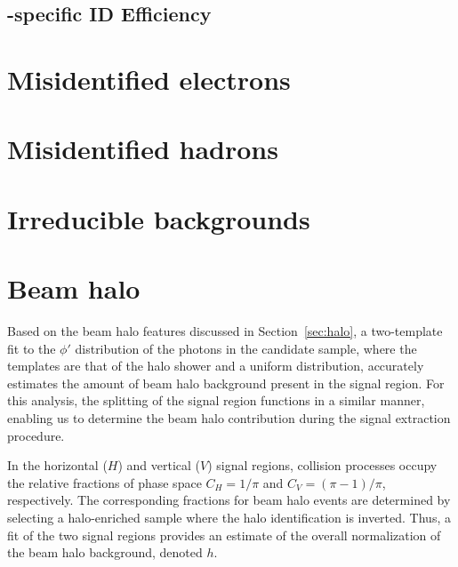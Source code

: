 

\subsection{\Pgg-specific ID Efficiency}
\label{sec:pvsf}



\section{Misidentified electrons}
\label{sec:efake}



\section{Misidentified hadrons}
\label{sec:hfake}



\section{Irreducible backgrounds}
\label{sec:irreducible}



\section{Beam halo}
\label{sec:halo_estimate}

Based on the beam halo features discussed in Section~\ref{sec:halo}, a two-template fit to the $\phi'$ distribution of the photons in the candidate sample, where the templates are that of the halo shower and a uniform distribution, accurately estimates the amount of beam halo background present in the signal region. 
For this analysis, the splitting of the signal region functions in a similar manner, enabling us to determine the beam halo contribution during the signal extraction procedure.

In the horizontal ($H$) and vertical ($V$) signal regions, collision processes occupy the relative fractions of phase space $C_{H} = 1/\pi$ and $C_{V} = (\pi-1)/\pi$, respectively. 
The corresponding fractions for beam halo events are determined by selecting a halo-enriched sample where the halo identification is inverted. 
Thus, a fit of the two signal regions provides an estimate of the overall normalization of the beam halo background, denoted $h$.
 

